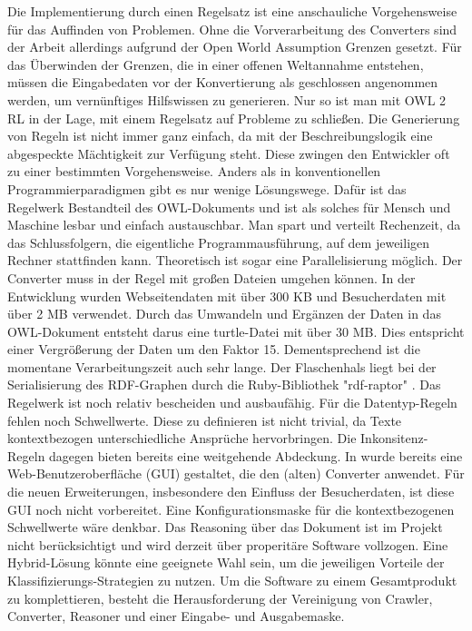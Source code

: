 \documentclass[runningheads,a4paper]{llncs}
\begin{document}
Die Implementierung durch einen Regelsatz ist eine anschauliche Vorgehensweise für das Auffinden von Problemen. 
Ohne die Vorverarbeitung des Converters sind der Arbeit allerdings aufgrund der Open World Assumption Grenzen gesetzt.
Für das Überwinden der Grenzen, die in einer offenen Weltannahme entstehen, müssen die Eingabedaten vor der Konvertierung als geschlossen angenommen werden, um vernünftiges Hilfswissen zu generieren.
Nur so ist man mit OWL 2 RL in der Lage, mit einem Regelsatz auf Probleme zu schließen.
Die Generierung von Regeln ist nicht immer ganz einfach, da mit der Beschreibungslogik eine abgespeckte Mächtigkeit zur Verfügung steht. 
Diese zwingen den Entwickler oft zu einer bestimmten Vorgehensweise.
Anders als in konventionellen Programmierparadigmen gibt es nur wenige Lösungswege.
Dafür ist das Regelwerk Bestandteil des OWL-Dokuments und ist als solches für Mensch und Maschine lesbar und einfach austauschbar.
Man spart und verteilt Rechenzeit, da das Schlussfolgern, die eigentliche Programmausführung, auf dem jeweiligen Rechner stattfinden kann.
Theoretisch ist sogar eine Parallelisierung möglich.
Der Converter muss in der Regel mit großen Dateien umgehen können.
In der Entwicklung wurden Webseitendaten mit über 300 KB und Besucherdaten  mit über 2 MB verwendet.
Durch das Umwandeln und Ergänzen der Daten in das OWL-Dokument entsteht darus eine turtle-Datei mit über 30 MB.
Dies entspricht einer Vergrößerung der Daten um den Faktor 15.
Dementsprechend ist die momentane Verarbeitungszeit auch sehr lange.
Der Flaschenhals liegt bei der Serialisierung des RDF-Graphen durch die Ruby-Bibliothek "{}rdf-raptor"{} \cite{rdf-raptor}.
Das Regelwerk ist noch relativ bescheiden und ausbaufähig.
Für die Datentyp-Regeln fehlen noch Schwellwerte.
Diese zu definieren ist nicht trivial, da Texte kontextbezogen unterschiedliche Ansprüche hervorbringen.
Die Inkonsitenz-Regeln dagegen bieten bereits eine weitgehende Abdeckung. 
In \cite{Brieger} wurde bereits eine Web-Benutzeroberfläche (GUI) gestaltet, die den (alten) Converter anwendet.
Für die neuen Erweiterungen, insbesondere den Einfluss der Besucherdaten, ist diese GUI noch nicht vorbereitet.
Eine Konfigurationsmaske für die kontextbezogenen Schwellwerte wäre denkbar.
Das Reasoning über das Dokument ist im Projekt nicht berücksichtigt und wird derzeit über properitäre Software vollzogen.
Eine Hybrid-Lösung könnte eine geeignete Wahl sein, um die jeweiligen Vorteile der Klassifizierungs-Strategien zu nutzen.
Um die Software zu einem Gesamtprodukt zu komplettieren, besteht die Herausforderung der Vereinigung von Crawler, Converter, Reasoner und einer Eingabe- und Ausgabemaske.

\nocite{url_dl_primer}



\end{document}
